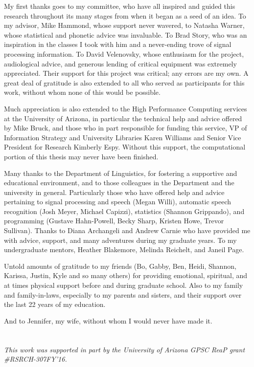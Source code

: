 My first thanks goes to my committee, who have all inspired and guided this research throughout its many stages from when it began as a seed of an idea.  To my advisor, Mike Hammond, whose support never wavered, to Natasha Warner, whose statistical and phonetic advice was invaluable.  To Brad Story, who was an inspiration in the classes I took with him and a never-ending trove of signal processing information.  To David Velenovsky, whose enthusiasm for the project, audiological advice, and generous lending of critical equipment was extremely appreciated.  Their support for this project was critical; any errors are my own. A great deal of gratitude is also extended to all who served as participants for this work, without whom none of this would be possible.

Much appreciation is also extended to the High Performance Computing services at the University of Arizona, in particular the technical help and advice offered by Mike Bruck, and those who in part responsible for funding this service, VP of Information Strategy and University Libraries Karen Williams and Senior Vice President for Research Kimberly Espy.  Without this support, the computational portion of this thesis may never have been finished.

Many thanks to the Department of Linguistics, for fostering a supportive and educational environment, and to those colleagues in the Department and the university in general.  Particularly those who have offered help and advice pertaining to signal processing and speech (Megan Willi), automatic speech recognition (Josh Meyer, Michael Capizzi), statistics (Shannon Grippando), and programming (Gustave Hahn-Powell, Becky Sharp, Kristen Howe, Trevor Sullivan).  Thanks to Diana Archangeli and Andrew Carnie who have provided me with advice, support, and many adventures during my graduate years.  To my undergraduate mentors, Heather Blakemore, Melinda Reichelt, and Janeil Page.

Untold amounts of gratitude to my friends (Bo, Gabby, Ben, Heidi, Shannon, Karissa, Justin, Kyle and so many others) for providing emotional, spiritual, and at times physical support before and during graduate school.  Also to my family and family-in-laws, especially to my parents and sisters, and their support over the last 22 years of my education.

And to Jennifer, my wife, without whom I would never have made it.
 \\
 \\
 \\
\textit{This work was supported in part by the University of Arizona GPSC ReaP grant \#RSRCH-307FY'16.}
